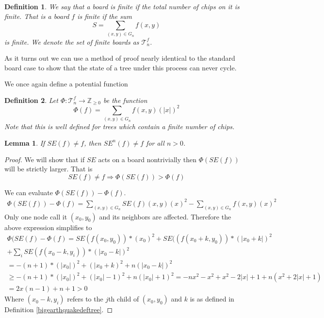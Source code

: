 \documentclass[11pt]{article}
\newtheorem{lemma}{Lemma}
\newtheorem{definition}{Definition}
\begin{document}
\begin{definition} 
We say that a board is finite if the total number of chips on it is finite. That is a board $f$ is finite if the sum
\begin{equation}
S= \sum_{(x,y) \in G_n} f(x,y) 
\end{equation}
is finite. 
We denote the set of finite boards as $\mathcal{T}_n^f$.
\end{definition}

As it turns out we can use a  method of proof nearly identical to the standard board case to show that the state of a tree under this process can never cycle.

We once again define a potential function 
\begin{definition} Let $\Phi: \mathcal{T}_n^f \rightarrow \mathbb{Z}_{\geq 0}$ be the  function
\begin{equation}
\Phi(f) = \sum_{(x,y) \in G_n} f(x,y)(|x|)^2
\end{equation}
Note that this is well defined for trees which contain a finite number of chips. 
\end{definition} 

\begin{lemma}
If $SE(f) \neq f$, then $SE^n(f) \neq f$ for all $n > 0$.
\end{lemma}

\begin{proof}
We will show that  if $SE$ acts on a board nontrivially then $\Phi(SE(f))$ will be strictly larger. That is  
\begin{equation}
SE(f) \neq f \Rightarrow \Phi(SE(f)) > \Phi(f)
\end{equation}


We can evaluate $\Phi(SE(f)) - \Phi(f)$.
\begin{align}
\Phi(SE(f))-\Phi(f) = \sum_{(x,y) \in G_n} SE(f)(x,y)(x)^2 - \sum_{(x,y) \in G_n} f(x,y)(x)^2 
\end{align}
Only one node call it $(x_0,y_0)$ and its neighbors are affected. Therefore the above expression simplifies to
\begin{align*}
\Phi(SE(f)-\Phi(f) = SE( f(x_0,y_0) )* (x_0)^2 + SE( (f(x_0+k, y_0) )* (|x_0+k|)^2 \\
+ \sum_{i} SE( f(x_0-k, y_i) ) * (|x_0-k|)^2 \\
= -(n+1)*(|x_0|)^2 + (|x_0+k)^2 + n (|x_0-k|)^2 \\
\geq-(n+1)*(|x_0|)^2 + (|x_0|-1)^2 + n (|x_0|+1)^2
= -nx^2-x^2+x^2-2|x|+1+n(x^2+2|x|+1) \\
= 2x(n-1)+n+1 > 0
\end{align*}
Where $(x_0-k,y_i)$ refers to the $j$th child of $(x_0,y_0)$ and $k$ is as defined in Definition \ref{bigearthquakedeftree}.
\end{proof}
\end{document}
